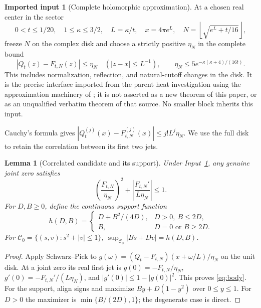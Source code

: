 \documentclass[11pt]{article}
\newtheorem{lemma}[theorem]{Lemma}
\theoremstyle{definition}
\newtheorem{assumption}[theorem]{Imported input}
\theoremstyle{remark}
\begin{document}
\begin{assumption}[Complete holomorphic approximation]
\label{input:disk}
At a chosen real center in the sector
\begin{equation}
 0<t\le1/20,\quad 1\le\kappa\le3/2,\quad
 L=\kappa/t,\quad x=4\pi e^L,\quad
 N=\left\lfloor\sqrt{e^L+t/16}\right\rfloor,
 \label{eq:sector}
\end{equation}
freeze $N$ on the complex disk and choose a strictly positive $\eta_N$
in the complete bound
\begin{equation}
 |Q_t(z)-F_{t,N}(z)|\le\eta_N\quad(|z-x|\le L^{-1}),
 \qquad \eta_N\le5e^{-\kappa(\kappa+4)/(16t)}.
 \label{eq:disk}
\end{equation}
This includes normalization, reflection, and natural-cutoff changes in
the disk. It is the precise interface imported from the parent heat
investigation using the approximation machinery of \cite{polymath};
it is not asserted as a new theorem of this paper, or as an unqualified
verbatim theorem of that source. No smaller block inherits this input.
\end{assumption}

Cauchy's formula gives
$|Q_t^{(j)}(x)-F_{t,N}^{(j)}(x)|\le j!L^j\eta_N$.
We use the full disk to retain the correlation between its first two jets.

\begin{lemma}[Correlated candidate and its support]
\label{lem:paid-body}
Under Input~\ref{input:disk}, any genuine joint zero satisfies
\begin{equation}
 \left(\frac{F_{t,N}}{\eta_N}\right)^2+
 \left|\frac{F_{t,N}'}{L\eta_N}\right|\le1.
 \label{eq:body}
\end{equation}
For $D,B\ge0$, define the continuous support function
\begin{equation}
 h(D,B)=
 \begin{cases}
 D+B^2/(4D),&D>0,\ B\le2D,\\
 B,&D=0\text{ or }B\ge2D.
 \end{cases}
 \label{eq:support}
\end{equation}
For $\mathcal C_0=\{(s,v):s^2+|v|\le1\}$,
$\sup_{\mathcal C_0}|Bs+Dv|=h(D,B)$.
\end{lemma}
\begin{proof}
Apply Schwarz--Pick to
$g(\omega)=(Q_t-F_{t,N})(x+\omega/L)/\eta_N$ on the unit disk.
At a joint zero its real first jet is
$g(0)=-F_{t,N}/\eta_N$,
$g'(0)=-F_{t,N}'/(L\eta_N)$, and
$|g'(0)|\le1-|g(0)|^2$. This proves \eqref{eq:body}.
For the support, align signs and maximize
$B y+D(1-y^2)$ over $0\le y\le1$.
For $D>0$ the maximizer is $\min\{B/(2D),1\}$; the degenerate case is
direct.
\end{proof}
\end{document}
